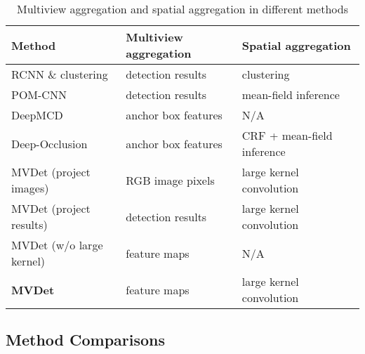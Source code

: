 \documentclass[runningheads]{llncs}
\begin{document}
\begin{table}[t]
\centering
\caption{Multiview aggregation and spatial aggregation in different methods}
\begin{tabular}{l|l|l}
\toprule
Method                           & Multiview aggregation                  & Spatial aggregation \\ \hline
RCNN \& clustering~\cite{xu2016multi}               & detection results & clustering                       \\ \hline
POM-CNN~\cite{fleuret2007multicamera}                          & detection results & mean-field inference                 \\ \hline
DeepMCD~\cite{chavdarova2017deep}                          & anchor box features        & N/A                              \\ \hline
Deep-Occlusion~\cite{baque2017deep}                   & anchor box features        &  CRF + mean-field inference          \\ \hline\hline
MVDet (project images)        & RGB image pixels             & large kernel convolution                    \\ \hline
MVDet (project results)       & detection results & large kernel convolution                      \\ \hline
MVDet (w/o large kernel)         & feature maps      & N/A                              \\ \hline
\textbf{MVDet}          & feature maps      & large kernel convolution                     \\
\bottomrule
\end{tabular}
\label{tab:notations}
\end{table}



\subsection{Method Comparisons}
\label{sec:sec:variants}
\end{document}
